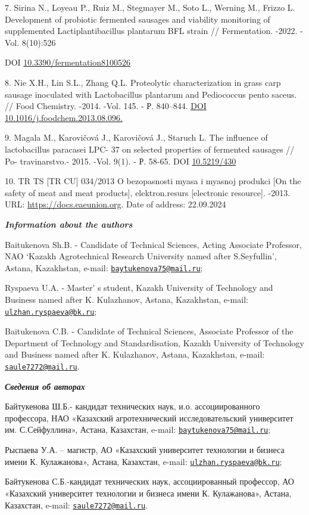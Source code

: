 \begin{references}
7. Sirina N., Loyeau P., Ruiz M., Stegmayer M., Soto L., Werning M.,
Frizzo L. Development of probiotic fermented sausages and viability
monitoring of supplemented Lactiplantibacillus plantarum BFL strain //
Fermentation. -2022. -Vol. 8(10):526

DOI
\href{https://doi.org/10.3390/fermentation8100526}{10.3390/fermentation8100526}

8. Nie X.H., Lin S.L., Zhang Q.L. Proteolytic characterization in grass
carp sausage inoculated with Lactobacillus plantarum and Pediococcus
pento saceus. // Food Chemistry. -2014. -Vol. 145. - Р. 840--844.
\href{https://doi.org/10.1016/j.foodchem.2013.08.096}{DOI
10.1016/j.foodchem.2013.08.096.}

9. Magala M., Karovičová J., Karovičová J., Staruch L. The influence of
lactobacillus paracasei LPC- 37 on selected properties of fermented
sausages // Po- travinarstvo.- 2015. -Vol. 9(1). - Р. 58-65. DOI
\href{https://doi.org/10.5219/430}{10.5219/430}

10. TR TS {[}TR CU{]} 034/2013 O bezopasnosti myasa i myasnoj produkci
{[}On the safety of meat and meat products{]}, elektron.resurs
{[}electronic resource{]}. -2013. URL:
\href{https://docs.eaeunion.org/docs/ru-ru/0043629/cncd\_11102013\_68}{https://docs.eaeunion.org}. Date of address: 22.09.2024
\end{references}

\begin{authorinfo}
\emph{{\bfseries Information about the authors}}

Baitukenova Sh.B. - Candidate of Technical Sciences, Acting Associate
Professor, NAO `Kazakh Agrotechnical Research University named after
S.Seyfullin', Astana, Kazakhstan, e-mail:
\href{mailto:baytukenova75@mail.ru}{\nolinkurl{baytukenova75@mail.ru}};

Ryspaeva U.A. - Master' s student, Kazakh University of
Technology and Business named after K. Kulazhanov, Astana, Kazakhstan,
e-mail:
\href{mailto:ulzhan.ryspaeva@bk.ru}{\nolinkurl{ulzhan.ryspaeva@bk.ru}};

Baitukenova C.B. - Candidate of Technical Sciences, Associate Professor
of the Department of Technology and Standardisation, Kazakh University
of Technology and Business named after K. Kulazhanov, Astana,
Kazakhstan, e-mail:
\href{mailto:saule7272@mail.ru}{\nolinkurl{saule7272@mail.ru}}.

\emph{{\bfseries Сведения об авторах}}

Байтукенова Ш.Б.- кандидат технических наук, и.о. ассоциированного
профессора, НАО «Казахский агротехнический исследовательский университет
им. С.Сейфуллина», Астана, Казахстан, e-mail:
\href{mailto:baytukenova75@mail.ru}{\nolinkurl{baytukenova75@mail.ru}};

Рыспаева У.А. -- магистр, АО «Казахский университет технологии и бизнеса
имени К. Кулажанова», Астана, Казахстан, e-mail:
\href{mailto:ulzhan.ryspaeva@bk.ru}{\nolinkurl{ulzhan.ryspaeva@bk.ru}};

Байтукенова С.Б.-кандидат технических наук, ассоциированный профессор,
АО «Казахский университет технологии и бизнеса имени К. Кулажанова»,
Астана, Казахстан, e-mail:
\href{mailto:saule7272@mail.ru}{\nolinkurl{saule7272@mail.ru}}.
\end{authorinfo}
